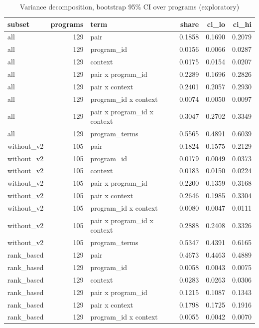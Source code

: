 \begin{table}[t]
\centering
\caption{Variance decomposition, bootstrap 95\% CI over programs (exploratory)}
\label{tab:v3-1-variance-decomposition}
\begin{tabular}{lrlrrr}
\toprule
subset & programs & term & share & ci\_lo & ci\_hi \\
\midrule
all & 129 & pair & 0.1858 & 0.1690 & 0.2079 \\
all & 129 & program\_id & 0.0156 & 0.0066 & 0.0287 \\
all & 129 & context & 0.0175 & 0.0154 & 0.0207 \\
all & 129 & pair x program\_id & 0.2289 & 0.1696 & 0.2826 \\
all & 129 & pair x context & 0.2401 & 0.2057 & 0.2930 \\
all & 129 & program\_id x context & 0.0074 & 0.0050 & 0.0097 \\
all & 129 & pair x program\_id x context & 0.3047 & 0.2702 & 0.3349 \\
all & 129 & program\_terms & 0.5565 & 0.4891 & 0.6039 \\
without\_v2 & 105 & pair & 0.1824 & 0.1575 & 0.2129 \\
without\_v2 & 105 & program\_id & 0.0179 & 0.0049 & 0.0373 \\
without\_v2 & 105 & context & 0.0183 & 0.0150 & 0.0224 \\
without\_v2 & 105 & pair x program\_id & 0.2200 & 0.1359 & 0.3168 \\
without\_v2 & 105 & pair x context & 0.2646 & 0.1985 & 0.3304 \\
without\_v2 & 105 & program\_id x context & 0.0080 & 0.0047 & 0.0111 \\
without\_v2 & 105 & pair x program\_id x context & 0.2888 & 0.2408 & 0.3326 \\
without\_v2 & 105 & program\_terms & 0.5347 & 0.4391 & 0.6165 \\
rank\_based & 129 & pair & 0.4673 & 0.4463 & 0.4889 \\
rank\_based & 129 & program\_id & 0.0058 & 0.0043 & 0.0075 \\
rank\_based & 129 & context & 0.0283 & 0.0263 & 0.0306 \\
rank\_based & 129 & pair x program\_id & 0.1215 & 0.1087 & 0.1343 \\
rank\_based & 129 & pair x context & 0.1798 & 0.1725 & 0.1916 \\
rank\_based & 129 & program\_id x context & 0.0055 & 0.0042 & 0.0070 \\

\end{tabular}
\end{table}
